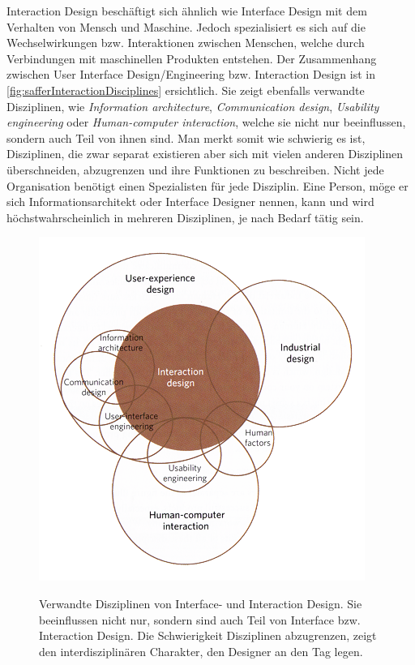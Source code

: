 \medskip Interaction Design beschäftigt sich ähnlich wie Interface Design mit dem Verhalten von Mensch und Maschine. Jedoch spezialisiert es sich auf die Wechselwirkungen bzw. Interaktionen zwischen Menschen, welche durch Verbindungen mit maschinellen Produkten entstehen. Der Zusammenhang zwischen User Interface Design/Engineering bzw. Interaction Design ist in \autoref{fig:safferInteractionDisciplines} ersichtlich. Sie zeigt ebenfalls verwandte Disziplinen, wie \emph{Information architecture}, \emph{Communication design}, \emph{Usability engineering} oder \emph{Human-computer interaction}, welche sie nicht nur beeinflussen, sondern auch Teil von ihnen sind. Man merkt somit wie schwierig es ist, Disziplinen, die zwar separat existieren aber sich mit vielen anderen Disziplinen überschneiden, abzugrenzen und ihre Funktionen zu beschreiben. Nicht jede Organisation benötigt einen Spezialisten für jede Disziplin. Eine Person, möge er sich Informationsarchitekt oder Interface Designer nennen, kann und wird höchstwahrscheinlich in mehreren Disziplinen, je nach Bedarf tätig sein. \citep{Saffer:2007}

\begin{figure}
	\begin{center}
        {\includegraphics[width=.8\linewidth]{gfx/safferInteractionDisciplines}}
	\end{center}
		\caption[Verwandte Disziplinen von Interface- und Interaction Design \newline \citep{Saffer:2007}]{Verwandte Disziplinen von Interface- und Interaction Design. Sie beeinflussen nicht nur, sondern sind auch Teil von Interface bzw. Interaction Design. Die Schwierigkeit	Disziplinen abzugrenzen, zeigt den interdisziplinären Charakter, den Designer an den Tag legen.}\label{fig:safferInteractionDisciplines}
\end{figure}

